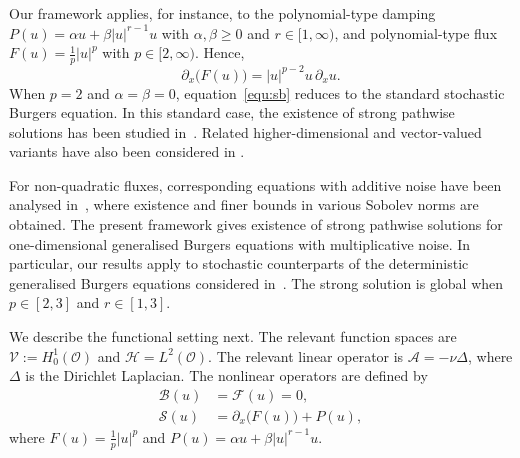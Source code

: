 \documentclass[11pt, reqno]{amsart}
\theoremstyle{definition}
\numberwithin{equation}{section}
\begin{document}
Our framework applies, for instance, to the polynomial-type damping $P(u)=\alpha u +\beta |u|^{r-1} u$ with $\alpha,\beta\geq 0$ and $r\in [1,\infty)$, and polynomial-type flux $F(u)=\frac1p |u|^p$ with $p\in [2,\infty)$. Hence,
\[
\partial_x \big(F(u)\big)=|u|^{p-2}u \,\partial_x u.
\]
When $p=2$ and $\alpha=\beta=0$, equation~\eqref{equ:sb} reduces to the standard stochastic
Burgers equation. In this standard case, the existence of strong pathwise
solutions has been studied in~\cite{DaGat95}. Related higher-dimensional
and vector-valued variants have also been considered in
\cite{BrzGolNek14, DonGuoWuZho23, DonWuZho24}. 

For non-quadratic fluxes, corresponding equations with additive noise have
been analysed in~\cite{Bor13a, Bor13b, Kim06}, where existence and finer bounds in
various Sobolev norms are obtained. The present framework gives existence
of strong pathwise solutions for one-dimensional generalised Burgers
equations with multiplicative noise. In particular, our results apply to
stochastic counterparts of the deterministic generalised Burgers equations
considered in~\cite{RaoSacRam03}. The strong solution is global when $p\in [2,3]$ and $r\in [1,3]$.

We describe the functional setting next.
The relevant function spaces are $\mathcal{V}:= H^1_0(\mathscr{O})$ and $\mathcal{H}=L^2(\mathscr{O})$. The relevant linear operator is $\mathcal{A}=-\nu\Delta$, where $\Delta$ is the Dirichlet Laplacian. The nonlinear operators are defined by \begin{align*}
	\mathcal{B}(u)&=\mathcal{F}(u)=0,
	\\
	\mathcal{S}(u)&= \partial_x\big(F(u)\big) + P(u),
\end{align*}
where $F(u)=\frac1p |u|^p$ and $P(u)=\alpha u +\beta |u|^{r-1} u$. 
\end{document}
